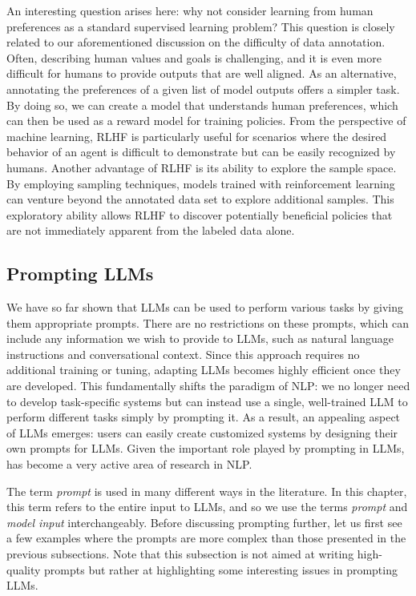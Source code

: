 An interesting question arises here: why not consider learning from human preferences as a standard supervised learning problem? This question is closely related to our aforementioned discussion on the difficulty of data annotation. Often, describing human values and goals is challenging, and it is even more difficult for humans to provide outputs that are well aligned. As an alternative, annotating the preferences of a given list of model outputs offers a simpler task. By doing so, we can create a model that understands human preferences, which can then be used as a reward model for training policies. From the perspective of machine learning, RLHF is particularly useful for scenarios where the desired behavior of an agent is difficult to demonstrate but can be easily recognized by humans. Another advantage of RLHF is its ability to explore the sample space. By employing sampling techniques, models trained with reinforcement learning can venture beyond the annotated data set to explore additional samples. This exploratory ability allows RLHF to discover potentially beneficial policies that are not immediately apparent from the labeled data alone.

\subsection{Prompting LLMs}

\noindent We have so far shown that LLMs can be used to perform various tasks by giving them appropriate prompts. There are no restrictions on these prompts, which can include any information we wish to provide to LLMs, such as natural language instructions and conversational context. Since this approach requires no additional training or tuning, adapting LLMs becomes highly efficient once they are developed. This fundamentally shifts the paradigm of NLP: we no longer need to develop task-specific systems but can instead use a single, well-trained LLM to perform different tasks simply by prompting it. As a result, an appealing aspect of LLMs emerges: users can easily create customized systems by designing their own prompts for LLMs. Given the important role played by prompting in LLMs,  has become a very active area of research in NLP.

The term \textit{prompt} is used in many different ways in the literature. In this chapter, this term refers to the entire input to LLMs, and so we use the terms \textit{prompt} and \textit{model input} interchangeably. Before discussing prompting further, let us first see a few examples where the prompts are more complex than those presented in the previous subsections. Note that this subsection is not aimed at writing high-quality prompts but rather at highlighting some interesting issues in prompting LLMs.

